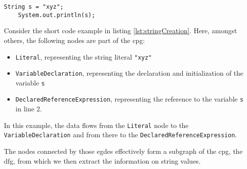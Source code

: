 \begin{lstlisting}[label={lst:stringCreation}, caption={Example code}, captionpos=b]
	String s = "xyz";
	System.out.println(s);
\end{lstlisting}

Consider the short code example in listing \ref{lst:stringCreation}. Here, amongst others, the following nodes are part of the \ac{cpg}:

\begin{itemize}
	\item \lstinline{Literal}, representing the string literal \lstinline{"xyz"}
	\item \lstinline{VariableDeclaration}, representing the declaration and initialization of the variable \lstinline{s}
	\item \lstinline{DeclaredReferenceExpression}, representing the reference to the variable \lstinline{s} in line 2.
\end{itemize}

In this example, the data flows from the \lstinline{Literal} node to the \lstinline{VariableDeclaration} and from there to the \lstinline{DeclaredReferenceExpression}.

The nodes connected by those egdes effectively form a subgraph of the \ac{cpg}, the \ac{dfg}, from which we then extract the information on string values.

